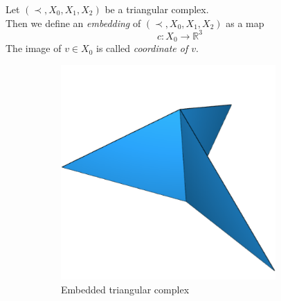 \documentclass{beamer}
\numberwithin{equation}{aufgabe}
\newcommand\R{\mathbb R}
\begin{document}
\begin{frame}
    \begin{definition}\label{def:embedding}
        Let $(\prec, X_0, X_1, X_2)$ be a triangular complex. \\ \pause
        Then we define an \emph{embedding} of $(\prec, X_0, X_1, X_2)$ as a map 
        $$c: X_0 \to \R^3$$ \pause
        The image of $v \in X_0$ is called \emph{coordinate of $v$}.
    \end{definition}
    \pause
    \begin{example}
        \vspace{-5px}
        \begin{figure}[H]
            \centering
            \begin{subfigure}[t]{0.3\textwidth}
                \centering
                \includegraphics[width=0.9\textwidth]{images/complex3.png} 
                Embedded triangular complex
            \end{subfigure}
            \hspace{50pt}
            \pause
            \begin{subfigure}[t]{0.3\textwidth}
                \centering

\end{subfigure}
\end{figure}
\end{example}
\end{frame}
\end{document}
